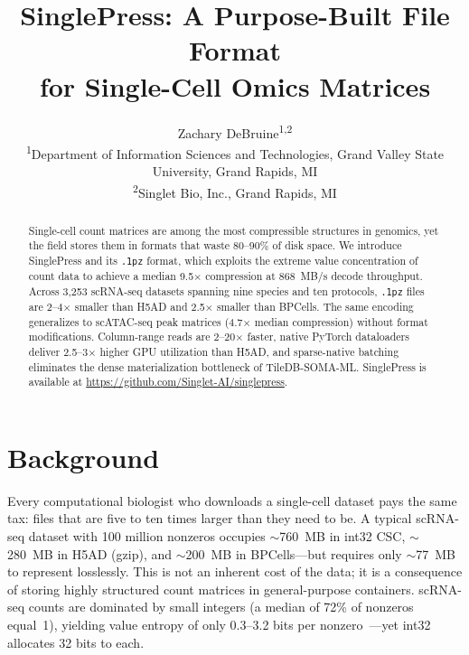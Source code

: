 \documentclass[10pt,twocolumn,letterpaper]{article}
\title{SinglePress: A Purpose-Built File Format\\for Single-Cell Omics Matrices}
\author{
  Zachary DeBruine\textsuperscript{1,2}\orcidicon{0000-0003-2234-4827}
  \\[6pt]
  \textsuperscript{1}Department of Information Sciences and Technologies, Grand Valley State University, Grand Rapids, MI
  \\[2pt]
  \textsuperscript{2}Singlet Bio, Inc., Grand Rapids, MI
}
\begin{document}
\maketitle
{}

\begin{abstract}
Single-cell count matrices are among the most compressible structures in genomics, yet the field stores them in formats that waste 80--90\% of disk space.
We introduce SinglePress and its \texttt{.1pz} format, which exploits the extreme value concentration of count data to achieve a median 9.5$\times$ compression at 868~MB/s decode throughput.
Across 3{,}253 scRNA-seq datasets spanning nine species and ten protocols, \texttt{.1pz} files are 2--4$\times$ smaller than H5AD and 2.5$\times$ smaller than BPCells.
The same encoding generalizes to scATAC-seq peak matrices (4.7$\times$ median compression) without format modifications.
Column-range reads are 2--20$\times$ faster, native PyTorch dataloaders deliver 2.5--3$\times$ higher GPU utilization than H5AD, and sparse-native batching eliminates the dense materialization bottleneck of TileDB-SOMA-ML.
SinglePress is available at \url{https://github.com/Singlet-AI/singlepress}.
\end{abstract}


\section{Background}

Every computational biologist who downloads a single-cell dataset pays the same tax: files that are five to ten times larger than they need to be.
A typical scRNA-seq dataset with 100 million nonzeros occupies $\sim$760~MB in int32 CSC, $\sim$280~MB in H5AD (gzip), and $\sim$200~MB in BPCells---but requires only $\sim$77~MB to represent losslessly.
This is not an inherent cost of the data; it is a consequence of storing highly structured count matrices in general-purpose containers.
scRNA-seq counts are dominated by small integers (a median of 72\% of nonzeros equal~1), yielding value entropy of only 0.3--3.2 bits per nonzero~\cite{wolfgang2024vcsc}---yet int32 allocates 32 bits to each.
\end{document}
